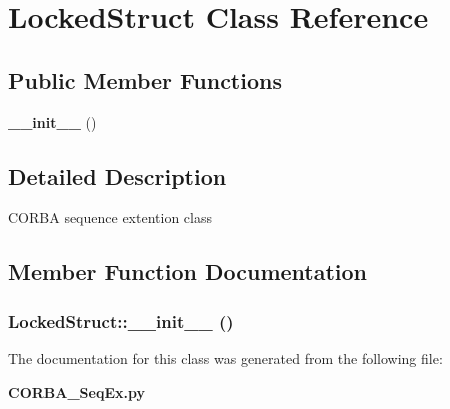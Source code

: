 \section{Locked\-Struct Class Reference}
\label{classLockedStruct}
\subsection*{Public Member Functions}
\begin{CompactItemize}
\item 
{\bf \_\-\_\-init\_\-\_\-} ()
\end{CompactItemize}


\subsection{Detailed Description}
CORBA sequence extention class 



\subsection{Member Function Documentation}
\subsubsection{\setlength{\rightskip}{0pt plus 5cm}Locked\-Struct::\_\-\_\-init\_\-\_\- ()}\label{classLockedStruct_LockedStructa0}




The documentation for this class was generated from the following file:\begin{CompactItemize}
\item 
{\bf CORBA\_\-Seq\-Ex.py}\end{CompactItemize}
